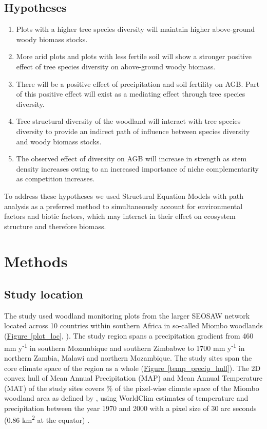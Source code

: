 \documentclass[11pt,a4paper]{article}
\begin{document}
\subsection{Hypotheses}

\begin{enumerate}
	\item{Plots with a higher tree species diversity will maintain higher above-ground woody biomass stocks.}
	\item{More arid plots and plots with less fertile soil will show a stronger positive effect of tree species diversity on above-ground woody biomass.} 
	\item{There will be a positive effect of precipitation and soil fertility on AGB. Part of this positive effect will exist as a mediating effect through tree species diversity.}
	\item{Tree structural diversity of the woodland will interact with tree species diversity to provide an indirect path of influence between species diversity and woody biomass stocks.}
	\item{The observed effect of diversity on AGB will increase in strength as stem density increases owing to an increased importance of niche complementarity as competition increases.}
\end{enumerate}

To address these hypotheses we used Structural Equation Models with path analysis as a preferred method to simultaneously account for environmental factors and biotic factors, which may interact in their effect on ecosystem structure and therefore biomass.

\section{Methods}

\subsection{Study location}

The study used \nplots{} woodland monitoring plots from the larger SEOSAW network \citep{seosaw_web} located across 10 countries within southern Africa in so-called Miombo woodlands (\hyperref[plot_loc]{Figure~\ref*{plot_loc}}, \citealt{White1987}). The study region spans a precipitation gradient from \textapprox{}460 mm y\textsuperscript{-1} in southern Mozambique and southern Zimbabwe to \textapprox{}1700 mm y\textsuperscript{-1} in northern Zambia, Malawi and northern Mozambique. The study sites span the core climate space of the region as a whole (\hyperref[temp_precip_hull]{Figure~\ref*{temp_precip_hull}}). The 2D convex hull of Mean Annual Precipitation (MAP) and Mean Annual Temperature (MAT) of the study sites covers \hullcover{}\% of the pixel-wise climate space of the Miombo woodland area as defined by \citet{White1987}, using WorldClim estimates of temperature and precipitation between the year 1970 and 2000 with a pixel size of 30 arc seconds (0.86 km\textsuperscript{2} at the equator) \citep{Fick2017}. 
\end{document}
